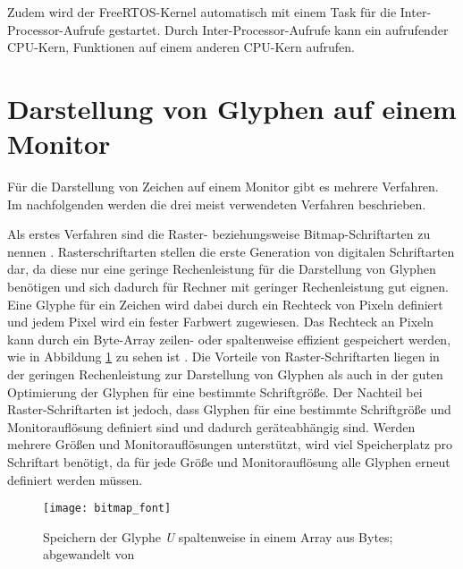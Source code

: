Zudem wird der FreeRTOS-Kernel automatisch mit einem Task für die Inter-Processor-Aufrufe gestartet. Durch Inter-Processor-Aufrufe kann ein aufrufender \acs{CPU}-Kern, Funktionen auf einem anderen \acs{CPU}-Kern aufrufen. \cites{espressifIPC}{espressifFreeRTOS}

\section{Darstellung von Glyphen auf einem Monitor}

Für die Darstellung von Zeichen auf einem Monitor gibt es mehrere Verfahren. Im nachfolgenden werden die drei meist verwendeten Verfahren beschrieben.

Als erstes Verfahren sind die Raster- beziehungsweise Bitmap-Schriftarten zu nennen \cite{microsoftFonts}. Rasterschriftarten stellen die erste Generation von digitalen Schriftarten dar, da diese nur eine geringe Rechenleistung für die Darstellung von Glyphen benötigen und sich dadurch für Rechner mit geringer Rechenleistung gut eignen. Eine Glyphe für ein Zeichen wird dabei durch ein Rechteck von Pixeln definiert und jedem Pixel wird ein fester Farbwert zugewiesen. Das Rechteck an Pixeln kann durch ein Byte-Array zeilen- oder spaltenweise effizient gespeichert werden, wie in Abbildung \ref{fig:bitmapFontArray} zu sehen ist \cite{sansonFont}. Die Vorteile von Raster-Schriftarten liegen in der geringen Rechenleistung zur Darstellung von Glyphen als auch in der guten Optimierung der Glyphen für eine bestimmte Schriftgröße. Der Nachteil bei Raster-Schriftarten ist jedoch, dass Glyphen für eine bestimmte Schriftgröße und Monitorauflösung definiert sind und dadurch geräteabhängig sind. Werden mehrere Größen und Monitorauflösungen unterstützt, wird viel Speicherplatz pro Schriftart benötigt, da für jede Größe und Monitorauflösung alle Glyphen erneut definiert werden müssen. \cites{strizverFont}{microsoftFonts}

\begin{figure}[h]
    \centering
    \texttt{[image: bitmap\_font]}
    \caption{Speichern der Glyphe \textit{U} spaltenweise in einem Array aus Bytes; abgewandelt von \cite{sansonFont}}
    \label{fig:bitmapFontArray}
\end{figure}

